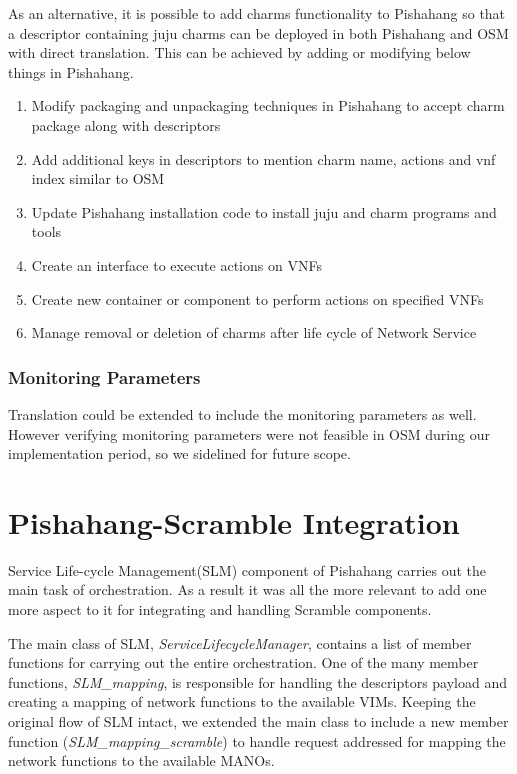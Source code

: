 As an alternative, it is possible to add charms functionality to Pishahang so that a descriptor containing juju charms can be deployed in both Pishahang and OSM with direct translation. This can be achieved by adding or modifying below things in Pishahang.
\begin{enumerate}
	\item Modify packaging and unpackaging techniques in Pishahang to accept charm package along with descriptors
	\item Add additional keys in descriptors to mention charm name, actions and vnf index similar to OSM
	\item Update Pishahang installation code to install juju and charm programs and tools
	\item Create an interface to execute actions on VNFs
	\item Create new container or component to perform actions on specified VNFs
	\item Manage removal or deletion of charms after life cycle of Network Service 
\end{enumerate} 


\subsubsection{Monitoring Parameters}
Translation could be extended to include the monitoring parameters as well. However verifying monitoring parameters were not feasible in OSM during our implementation period, so we sidelined for future scope.

\newpage





\section{Pishahang-Scramble Integration}

Service Life-cycle Management(SLM) component of Pishahang carries out the main task of orchestration. As a result it was all the more relevant to add one more aspect to it for integrating and handling Scramble components.

The main class of SLM, \textit{ServiceLifecycleManager}, contains a list of member functions for carrying out the entire orchestration. One of the many member functions, \textit{SLM\_mapping}, is responsible for handling the descriptors payload and creating a mapping of network functions to the available VIMs. Keeping the original flow of SLM intact, we extended the main class to include a new member function (\textit{SLM\_mapping\_scramble}) to handle request addressed for mapping the network functions to the available MANOs.

